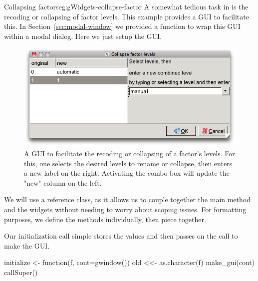 \begin{example}{Collapsing factors}{eg:gWidgets-collapse-factor}
A somewhat tedious task in \R{} is the recoding or collapsing of
factor levels. This example provides a GUI to facilitate this. In
Section~\ref{sec:modal-window} we provided a function to wrap this
GUI within a modal dialog. Here we just setup the GUI. 

 \begin{figure}
   \centering
   \includegraphics[width=.8\textwidth]{fig-gWidgets-collapse-factor.png}
   \caption{A GUI to facilitate the recoding or collapsing of a factor's levels. For this, one selects the desired levels to rename or collapse, then enters a new label on the right. Activating the combo box will update the "new" column on the left.}
   \label{fig:gWidgets-collapse-factor}
  \end{figure}
  
  
  We will use a reference class, as it allows us to couple together
  the main method and the widgets without needing to worry about
  scoping issues. For formatting purposes, we define the methods
  individually, then piece together.
  
  Our initialization call simple stores the values and then passes on
  the call to make the GUI.
\begin{Schunk}
\begin{Sinput}
 initialize <- function(f, cont=gwindow()) {
   old <<- as.character(f)
   make_gui(cont)
   callSuper()
 }
\end{Sinput}
\end{Schunk}


\end{example}
